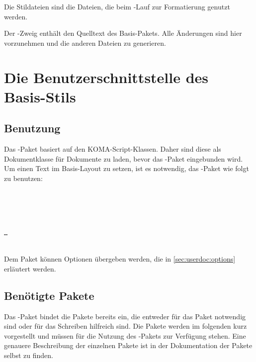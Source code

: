 
Die Stildateien sind die Dateien, die beim -Lauf zur Formatierung genutzt werden.


Der -Zweig enthält den Quelltext des Basis-Pakets.
Alle Änderungen sind hier vorzunehmen und die anderen Dateien zu generieren.



\section{Die Benutzerschnittstelle des Basis-Stils}

\subsection{Benutzung}

Das -Paket basiert auf den KOMA-Script-Klassen.
Daher sind diese als Dokumentklasse für Dokumente zu laden, bevor das -Paket eingebunden wird.
Um einen Text im Basis-Layout zu setzen, ist es notwendig, das -Paket wie folgt zu benutzen:

\begin{nutzung}
		\>\\
	\beispiel
		\>\\
		\>\\
		\>\\
		\>\texttt{\dots}\\
		\>\\
\end{nutzung}

Dem Paket können Optionen übergeben werden, die in \autoref{sec:userdoc:options} erläutert werden.

\subsection{Benötigte Pakete}
\label{sec:userdoc:packages}

Das -Paket bindet die Pakete bereits ein, die entweder für das Paket notwendig sind oder für das Schreiben hilfreich sind.
Die Pakete werden im folgenden kurz vorgestellt und müssen für die Nutzung des -Pakets zur Verfügung stehen.
Eine genauere Beschreibung der einzelnen Pakete ist in der Dokumentation der Pakete selbst zu finden.

